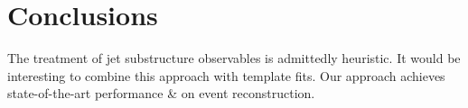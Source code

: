 \section{Conclusions}\label{sec:conclusions}

The treatment of jet substructure observables is admittedly heuristic.
It would be interesting to combine this approach with template fits. Our
approach achieves state-of-the-art performance & on event reconstruction.

